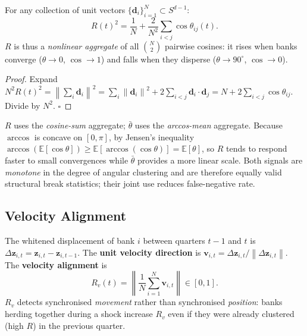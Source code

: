 \documentclass[journal]{IEEEtran}
\newcommand{\E}{\mathbb{E}}
\newcommand{\norm}[1]{\left\lVert#1\right\rVert}
\begin{document}
\begin{theorem}
\label{thm:mrl_cosine}
For any collection of unit vectors $\{\mathbf{d}_i\}_{i=1}^N \subset S^{d-1}$:
\begin{equation}
  R(t)^2 = \frac{1}{N} + \frac{2}{N^2}\sum_{i<j}\cos\theta_{ij}(t).
  \label{eq:R2_pairwise}
\end{equation}
$R$ is thus a \emph{nonlinear aggregate} of all $\binom{N}{2}$ pairwise cosines:
it rises when banks converge ($\theta\to 0$, $\cos\to 1$) and falls when
they disperse ($\theta\to 90^\circ$, $\cos\to 0$).
\end{theorem}

\begin{proof}
Expand $N^2 R(t)^2 = \norm{\sum_i \mathbf{d}_i}^2
= \sum_i \norm{\mathbf{d}_i}^2 + 2\sum_{i<j}\mathbf{d}_i\cdot\mathbf{d}_j
= N + 2\sum_{i<j}\cos\theta_{ij}$.
Divide by $N^2$. $\square$
\end{proof}

\begin{remark}
$R$ uses the \emph{cosine-sum} aggregate; $\bar\theta$ uses the
\emph{arccos-mean} aggregate.  Because $\arccos$ is concave on $[0,\pi]$,
by Jensen's inequality $\arccos(\E[\cos\theta]) \ge \E[\arccos(\cos\theta)]
= \E[\theta]$, so $R$ tends to respond faster to small convergences while
$\bar\theta$ provides a more linear scale.  Both signals are \emph{monotone}
in the degree of angular clustering and are therefore equally valid
structural break statistics; their joint use reduces false-negative rate.
\end{remark}

\subsection{Velocity Alignment}
\label{ssec:vel}

\begin{definition}
The whitened displacement of bank $i$ between quarters $t-1$ and $t$ is
$\Delta\mathbf{z}_{i,t} = \mathbf{z}_{i,t} - \mathbf{z}_{i,t-1}$.
The \textbf{unit velocity direction} is
$\mathbf{v}_{i,t} = \Delta\mathbf{z}_{i,t}/\norm{\Delta\mathbf{z}_{i,t}}$.
The \textbf{velocity alignment} is
\begin{equation}
  R_v(t) = \left\|\frac{1}{N}\sum_{i=1}^N \mathbf{v}_{i,t}\right\| \in [0,1].
  \label{eq:Rv}
\end{equation}
$R_v$ detects synchronised \emph{movement} rather than synchronised
\emph{position}: banks herding together during a shock increase $R_v$
even if they were already clustered (high $R$) in the previous quarter.
\end{definition}
\end{document}
